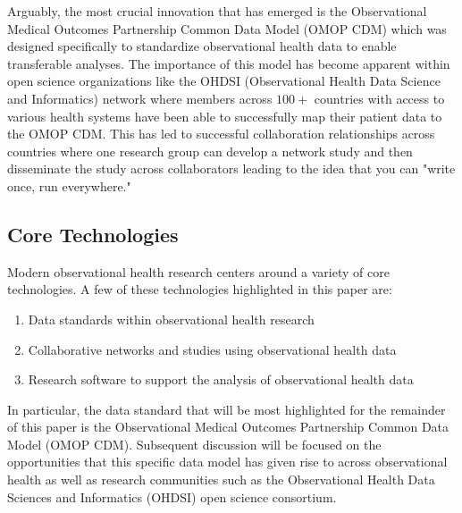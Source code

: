 \documentclass{juliacon}
\begin{document}
Arguably, the most crucial innovation that has emerged is the Observational Medical Outcomes Partnership Common Data Model (OMOP CDM) which was designed specifically to standardize observational health data to enable transferable analyses. \cite{overhage2012validation}
The importance of this model has become apparent within open science organizations like the OHDSI (Observational Health Data Science and Informatics) network where members across $100+$ countries \cite{sachsonOurJourney2023} with access to various health systems have been able to successfully map their patient data to the OMOP CDM.
This has led to successful collaboration relationships across countries where one research group can develop a network study and then disseminate the study across collaborators leading to the idea that you can "write once, run everywhere."\footnotemark


\subsection{Core Technologies}

Modern observational health research centers around a variety of core technologies.
A few of these technologies highlighted in this paper are:

\begin{enumerate}

\item Data standards within observational health research
\item Collaborative networks and studies using observational health data
\item Research software to support the analysis of observational health data

\end{enumerate}

In particular, the data standard that will be most highlighted for the remainder of this paper is the Observational Medical Outcomes Partnership Common Data Model (OMOP CDM).
Subsequent discussion will be focused on the opportunities that this specific data model has given rise to across observational health as well as research communities such as the Observational Health Data Sciences and Informatics (OHDSI) open science consortium.
\end{document}

